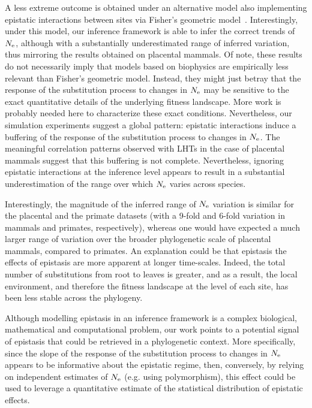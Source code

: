\documentclass{MBE}
\begin{document}
	A less extreme outcome is obtained under an alternative model also implementing epistatic interactions between sites via Fisher’s geometric model~\citep{Tenaillon2014,Blanquart2016}.
	Interestingly, under this model, our inference framework is able to infer the correct trends of $N_{\text{e}}$, although with a substantially underestimated range of inferred variation, thus mirroring the results obtained on placental mammals.
	Of note, these results do not necessarily imply that models based on biophysics are empirically less relevant than Fisher’s geometric model.
	Instead, they might just betray that the response of the {substitution} process to changes in $N_{\text{e}}$ may be sensitive to the exact quantitative details of the underlying fitness landscape.
	More work is probably needed here to characterize these exact conditions.
	Nevertheless, our simulation experiments suggest a global pattern: epistatic interactions induce a buffering of the response of the {substitution} process to changes in $N_{\text{e}}$.
	The meaningful correlation patterns observed with {LHT}s in the case of placental mammals suggest that this buffering is not complete.
	Nevertheless, ignoring epistatic interactions at the inference level appears to result in a substantial underestimation of the range over which $N_{\text{e}}$ varies across species.

	Interestingly, the magnitude of the inferred range of $N_{\text{e}}$ variation is similar for the placental and the primate datasets (with a 9-fold and 6-fold variation in mammals and primates, respectively), whereas one would have expected a much larger range of variation over the broader phylogenetic scale of placental mammals, compared to primates.
	An explanation could be that epistasis the effects of epistasis are more apparent at longer time-scales.
	Indeed, the total number of substitutions from root to leaves is greater, and as a result, the local environment, and therefore the fitness landscape at the level of each site, has been less stable across the phylogeny.

	Although modelling epistasis in an inference framework is a complex biological, mathematical and computational problem, our work points to a potential signal of epistasis that could be retrieved in a phylogenetic context.
	More specifically, since the slope of the response of the {substitution} process to changes in $N_{\text{e}}$ appears to be informative about the epistatic regime, then, conversely, by relying on independent estimates of $N_{\text{e}}$ (e.g. using polymorphism), this effect could be used to leverage a quantitative estimate of the statistical distribution of epistatic effects.
\end{document}
